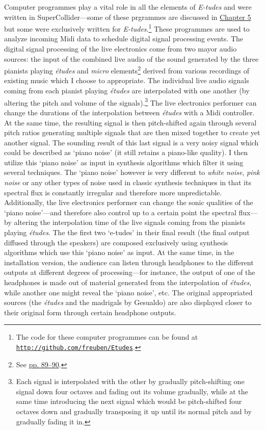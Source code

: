 Computer programmes play a vital role in all the elements of \emph{E-tudes} and were written in SuperCollider---some of these prgrammes are discussed in \hyperlink{chapter5}{Chapter 5} but some were exclusively written for \emph{E-tudes}.\footnote{The code for these computer programmes can be found at \href{http://github.com/freuben/Etudes}{\texttt {http://github.com/freuben/Etudes}}.} These programmes are used to analyze incoming Midi data to schedule digital signal processing events. The digital signal processing of the live electronics come from two mayor audio sources: the input of the combined live audio of the sound generated by the three pianists playing \emph{\'{e}tudes} and \emph{micro} elements\footnote{See \hyperlink{macroplunder}{pp. 89--90}.} derived from various recordings of existing music which I choose to appropriate. The individual live audio signals coming from each pianist playing \emph{\'{e}tudes} are interpolated with one another (by altering the pitch and volume of the signals).\footnote{Each signal is interpolated with the other by gradually pitch-shifting one signal down four octaves and fading out its volume gradually, while at the same time introducing the next signal which would be pitch-shifted four octaves down and gradually transposing it up until its normal pitch and by gradually fading it in.} The live electronics performer can change the durations of the interpolation between \emph{\'{e}tudes} with a Midi controller. At the same time, the resulting signal is then pitch-shifted again through several pitch ratios generating multiple signals that are then mixed together to create yet another signal. The sounding result of this last signal is a very noisy signal which could be described as `piano noise' (it still retains a piano-like quality). I then utilize this `piano noise' as input in synthesis algorithms which filter it using several techniques. The `piano noise' however is very different to \emph{white noise}, \emph{pink noise} or any other types of noise used in classic synthesis techniques in that its spectral flux is constantly irregular and therefore more unpredictable. Additionally, the live electronics performer can change the sonic qualities of the `piano noise'---and therefore also control up to a certain point the spectral flux---by altering the interpolation time of the live signals coming from the pianists playing \emph{\'{e}tudes}. The the first two `e-tudes' in their final result (the final output diffused through the speakers) are composed exclusively using synthesis algorithms which use this `piano noise' as input. At the same time, in the installation version, the audience can listen through headphones to the different outputs at different degrees of processing---for instance, the output of one of the headphones is made out of material generated from the interpolation of \emph{\'{e}tudes}, while another one might reveal the `piano noise', etc. The original appropriated sources (the \emph{\'{e}tudes} and the madrigals by Gesualdo) are also displayed closer to their original form through certain headphone outputs. 

